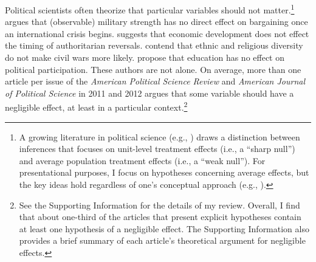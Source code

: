 \documentclass[12pt]{article}
\begin{document}
\doublespace


Political scientists often theorize that particular variables should not matter.\footnote{A growing literature in political science (e.g., \citealt{Bowers2012}) draws a distinction between inferences that focuses on unit-level treatment effects (i.e., a ``sharp null'') and average population treatment effects (i.e., a ``weak null''). For presentational purposes, I focus on hypotheses concerning average effects, but the key ideas hold regardless of one's conceptual approach (e.g., \citealt{RosenbaumSilber2009}).} \cite{Fearon1994} argues that (observable) military strength has no direct effect on bargaining once an international crisis begins. \cite{Svolik2008} suggests that economic development does not effect the timing of authoritarian reversals. \cite{FearonLaitin2003} contend that ethnic and religious diversity do not make civil wars more likely. \cite{KamPalmer2008} propose that education has no effect on political participation. These authors are not alone. On average, more than one article per issue of the \textit{American Political Science Review} and \textit{American Journal of Political Science} in 2011 and 2012 argues that some variable should have a negligible effect, at least in a particular context.\footnote{See the Supporting Information for the details of my review. Overall, I find that about one-third of the articles that present explicit hypotheses contain at least one hypothesis of a negligible effect. The Supporting Information also provides a brief summary of each article's theoretical argument for negligible effects.}
 
\end{document}
